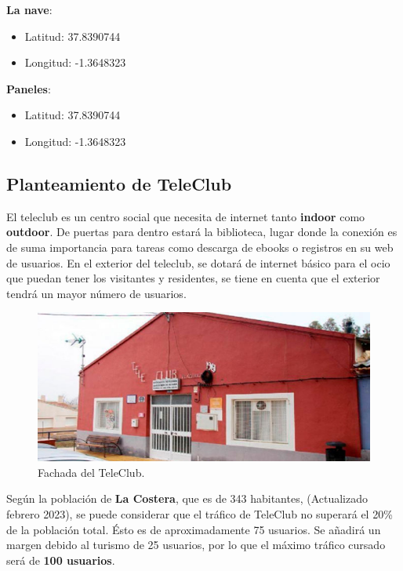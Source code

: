 \documentclass{article}
\begin{document}
\quad

\textbf{La nave}:
\begin{itemize}

    \item Latitud: 37.8390744
    \item Longitud: -1.3648323

\end{itemize}

\quad

\textbf{Paneles}:
\begin{itemize}

    \item Latitud: 37.8390744
    \item Longitud: -1.3648323

\end{itemize}


\subsection{Planteamiento de TeleClub}

El teleclub es un centro social que necesita de internet tanto \textbf{indoor} como \textbf{outdoor}. De puertas para dentro estará la biblioteca, lugar donde la conexión es de suma importancia para tareas como descarga de ebooks o registros en su web de usuarios. En el exterior del teleclub, se dotará de internet básico para el ocio que puedan tener los visitantes y residentes, se tiene en cuenta que el exterior tendrá un mayor número de usuarios.

\quad

\begin{figure}[ht]
    \centering
    \includegraphics[width=0.5\linewidth]{src/teleclub.jpg}
    \caption{\label{fig:teleclub} Fachada del TeleClub.}
\end{figure}


Según la población de \textbf{La Costera}, que es de 343 habitantes, (Actualizado febrero 2023), se puede considerar que el tráfico de TeleClub no superará el 20\% de la población total. Ésto es de aproximadamente 75 usuarios. Se añadirá un margen debido al turismo de 25 usuarios, por lo que el máximo tráfico cursado será de \textbf{100 usuarios}.
\end{document}
